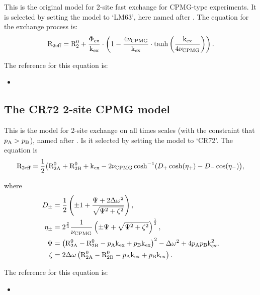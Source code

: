 This is the original model for 2-site fast exchange for CPMG-type experiments.  It is selected by setting the model to `LM63', here named after \citet{LuzMeiboom63}.  The equation for the exchange process is:
\begin{equation}
    \mathrm{R}_{2\textrm{eff}} = \mathrm{R}_2^0 + \frac{\Phi_\textrm{ex}}{\textrm{k}_\textrm{ex}} \cdot \left( 1 - \frac{4\nu_\textrm{CPMG}}{\textrm{k}_\textrm{ex}} \cdot \tanh \left( \frac{\textrm{k}_\textrm{ex}}{4\nu_\textrm{CPMG}} \right) \right) .
\end{equation}

The reference for this equation is:
\begin{itemize}
\item {}
\end{itemize}




\subsection{The CR72 2-site CPMG model}

This is the model for 2-site exchange on all times scales (with the constraint that $p_\textrm{A} > p_\textrm{B}$), named after \citet{CarverRichards72}.  Is it selected by setting the model to `CR72'.  The equation is
\begin{equation}
    \mathrm{R}_{2\textrm{eff}} = \frac{1}{2} \big( \textrm{R}_\textrm{2A}^0 + \textrm{R}_\textrm{2B}^0 + \textrm{k}_\textrm{ex} - 2\nu_\textrm{CPMG}\cosh^{-1} (D_+\cosh(\eta_+) - D_-\cos(\eta_-) \big) ,
\end{equation}

where
\begin{align}
    D_\pm    &= \frac{1}{2} \left( \pm1 + \frac{\Psi + 2\Delta\omega^2}{\sqrt{\Psi^2 + \zeta^2}} \right) , \\
    \eta_\pm &= 2^{\frac{2}{3}}\frac{1}{\nu_\textrm{CPMG}} \left( \pm\Psi + \sqrt{\Psi^2 + \zeta^2} \right)^{\frac{1}{2}} , \\
    \Psi     &= \left( \textrm{R}_\textrm{2A}^0 - \textrm{R}_\textrm{2B}^0 - p_\textrm{A}\textrm{k}_\textrm{ex} + p_\textrm{B}\textrm{k}_\textrm{ex} \right)^2 - \Delta\omega^2 + 4p_\textrm{A}p_\textrm{B}\textrm{k}_\textrm{ex}^2 , \\
    \zeta    &= 2\Delta\omega \left( \textrm{R}_\textrm{2A}^0 - \textrm{R}_\textrm{2B}^0 - p_\textrm{A}\textrm{k}_\textrm{ex} + p_\textrm{B}\textrm{k}_\textrm{ex} \right).
\end{align}

The reference for this equation is:
\begin{itemize}
\item {}
\end{itemize}

